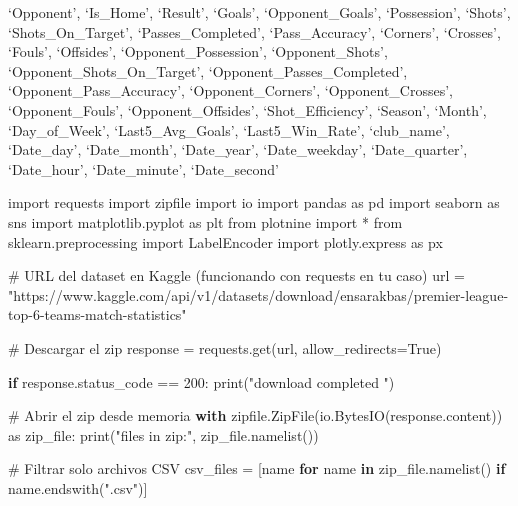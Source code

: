 \documentclass[
  letterpaper,
  DIV=11,
  numbers=noendperiod]{scrartcl}
\author{}
\date{}
\newenvironment{Shaded}{\begin{snugshade}}{\end{snugshade}}
\newcommand{\BuiltInTok}[1]{\textcolor[rgb]{0.00,0.23,0.31}{#1}}
\newcommand{\CommentTok}[1]{\textcolor[rgb]{0.37,0.37,0.37}{#1}}
\newcommand{\ControlFlowTok}[1]{\textcolor[rgb]{0.00,0.23,0.31}{\textbf{#1}}}
\newcommand{\DecValTok}[1]{\textcolor[rgb]{0.68,0.00,0.00}{#1}}
\newcommand{\ImportTok}[1]{\textcolor[rgb]{0.00,0.46,0.62}{#1}}
\newcommand{\KeywordTok}[1]{\textcolor[rgb]{0.00,0.23,0.31}{\textbf{#1}}}
\newcommand{\NormalTok}[1]{\textcolor[rgb]{0.00,0.23,0.31}{#1}}
\newcommand{\OperatorTok}[1]{\textcolor[rgb]{0.37,0.37,0.37}{#1}}
\newcommand{\StringTok}[1]{\textcolor[rgb]{0.13,0.47,0.30}{#1}}
\newcommand{\VariableTok}[1]{\textcolor[rgb]{0.07,0.07,0.07}{#1}}
\begin{document}
`Opponent', `Is\_Home', `Result', `Goals', `Opponent\_Goals',
`Possession', `Shots', `Shots\_On\_Target', `Passes\_Completed',
`Pass\_Accuracy', `Corners', `Crosses', `Fouls', `Offsides',
`Opponent\_Possession', `Opponent\_Shots',
`Opponent\_Shots\_On\_Target', `Opponent\_Passes\_Completed',
`Opponent\_Pass\_Accuracy', `Opponent\_Corners', `Opponent\_Crosses',
`Opponent\_Fouls', `Opponent\_Offsides', `Shot\_Efficiency', `Season',
`Month', `Day\_of\_Week', `Last5\_Avg\_Goals', `Last5\_Win\_Rate',
`club\_name', `Date\_day', `Date\_month', `Date\_year', `Date\_weekday',
`Date\_quarter', `Date\_hour', `Date\_minute', `Date\_second'

\begin{Shaded}
\begin{Highlighting}[]
\ImportTok{import}\NormalTok{ requests}
\ImportTok{import}\NormalTok{ zipfile}
\ImportTok{import}\NormalTok{ io}
\ImportTok{import}\NormalTok{ pandas }\ImportTok{as}\NormalTok{ pd}
\ImportTok{import}\NormalTok{ seaborn }\ImportTok{as}\NormalTok{ sns}
\ImportTok{import}\NormalTok{ matplotlib.pyplot }\ImportTok{as}\NormalTok{ plt}
\ImportTok{from}\NormalTok{ plotnine }\ImportTok{import} \OperatorTok{*}
\ImportTok{from}\NormalTok{ sklearn.preprocessing }\ImportTok{import}\NormalTok{ LabelEncoder}
\ImportTok{import}\NormalTok{ plotly.express }\ImportTok{as}\NormalTok{ px}

\CommentTok{\# URL del dataset en Kaggle (funcionando con requests en tu caso)}
\NormalTok{url }\OperatorTok{=} \StringTok{"https://www.kaggle.com/api/v1/datasets/download/ensarakbas/premier{-}league{-}top{-}6{-}teams{-}match{-}statistics"}

\CommentTok{\# Descargar el zip}
\NormalTok{response }\OperatorTok{=}\NormalTok{ requests.get(url, allow\_redirects}\OperatorTok{=}\VariableTok{True}\NormalTok{)}

\ControlFlowTok{if}\NormalTok{ response.status\_code }\OperatorTok{==} \DecValTok{200}\NormalTok{:}
    \BuiltInTok{print}\NormalTok{(}\StringTok{"download completed "}\NormalTok{)}

    \CommentTok{\# Abrir el zip desde memoria}
    \ControlFlowTok{with}\NormalTok{ zipfile.ZipFile(io.BytesIO(response.content)) }\ImportTok{as}\NormalTok{ zip\_file:}
        \BuiltInTok{print}\NormalTok{(}\StringTok{"files in zip:"}\NormalTok{, zip\_file.namelist())}

        \CommentTok{\# Filtrar solo archivos CSV}
\NormalTok{        csv\_files }\OperatorTok{=}\NormalTok{ [name }\ControlFlowTok{for}\NormalTok{ name }\KeywordTok{in}\NormalTok{ zip\_file.namelist() }\ControlFlowTok{if}\NormalTok{ name.endswith(}\StringTok{".csv"}\NormalTok{)]}


\end{Highlighting}
\end{Shaded}
\end{document}
